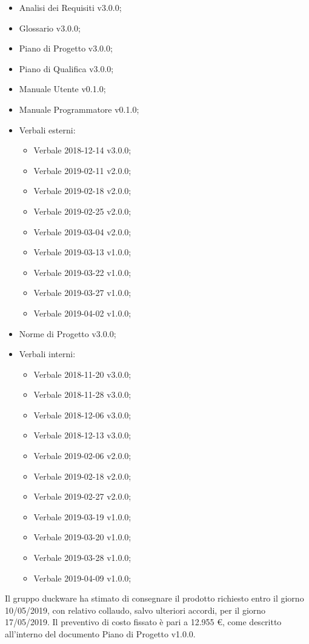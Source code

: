 \documentclass[a4paper,12pt]{article}
\begin{document}
\begin{itemize}
\item Analisi dei Requisiti v3.0.0;
\item Glossario v3.0.0;
\item Piano di Progetto v3.0.0;
\item Piano di Qualifica v3.0.0;
\item Manuale Utente v0.1.0;
\item Manuale Programmatore v0.1.0;
\item Verbali esterni:
	\begin{itemize}
		\item Verbale 2018-12-14 v3.0.0;
		\item Verbale 2019-02-11 v2.0.0;
		\item Verbale 2019-02-18 v2.0.0;
		\item Verbale 2019-02-25 v2.0.0;
		\item Verbale 2019-03-04 v2.0.0;
		\item Verbale 2019-03-13 v1.0.0;
		\item Verbale 2019-03-22 v1.0.0;
		\item Verbale 2019-03-27 v1.0.0;
		\item Verbale 2019-04-02 v1.0.0;
	\end{itemize}
\item Norme di Progetto v3.0.0;
\item Verbali interni:
	\begin{itemize}
		\item Verbale 2018-11-20 v3.0.0;
		\item Verbale 2018-11-28 v3.0.0;
		\item Verbale 2018-12-06 v3.0.0;
		\item Verbale 2018-12-13 v3.0.0;
		\item Verbale 2019-02-06 v2.0.0;
		\item Verbale 2019-02-18 v2.0.0;
		\item Verbale 2019-02-27 v2.0.0;
		\item Verbale 2019-03-19 v1.0.0;
		\item Verbale 2019-03-20 v1.0.0;
		\item Verbale 2019-03-28 v1.0.0;
		\item Verbale 2019-04-09 v1.0.0;
	\end{itemize}
\end{itemize}
Il gruppo duckware ha stimato di consegnare il prodotto richiesto entro il giorno 10/05/2019, con relativo collaudo, salvo ulteriori accordi, per il giorno 17/05/2019. Il preventivo di costo fissato è pari a 12.955 \euro, come descritto all’interno del documento Piano di Progetto v1.0.0.\\[0.5cm]
\end{document}
